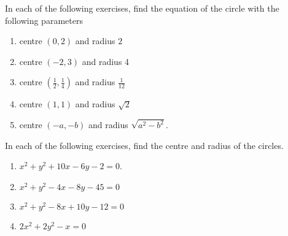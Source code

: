 In each of the following exercises, find the equation of the circle with the following parameters
\begin{enumerate}[label=\thesection.\arabic*,ref=\thesection.\theenumi]
 \item centre $(0,2)$ and radius $2$
	 \\
		\solution
\label{chapters/11/11/1/1}

%
  \item centre $(-2,3)$ and radius 4
	 \\
		\solution
\label{chapters/11/11/1/2}


  \item centre $\left(\frac{1}{2}, \frac{1}{4}\right)$ and radius $\frac{1}{12}$
\label{chapters/11/11/1/3}
	 \\
		\solution


  \item centre $(1,1)$ and radius $\sqrt{2}$
	 \\
		\solution


  \item centre $(-a,-b)$ and radius $\sqrt{a^{2}-b^{2}}$.
	 \\
		\solution
\label{chapters/11/11/1/5}

\end{enumerate}


In each of the following exercises,  find the centre and radius of the circles.
\begin{enumerate}[resume*]
\item  $x^2+y^2 +10x -6y -2=0$. 
	 \\
		\solution
\label{chapters/11/11/1/6}

\item  $x^{2}+y^{2}-4 x-8 y-45=0$
\item  $x^{2}+y^{2}-8 x+10 y-12=0$ 
	 \\
		\solution
\label{chapters/11/11/1/8}

\item  $2 x^{2}+2 y^{2}-x=0$
\end{enumerate}

